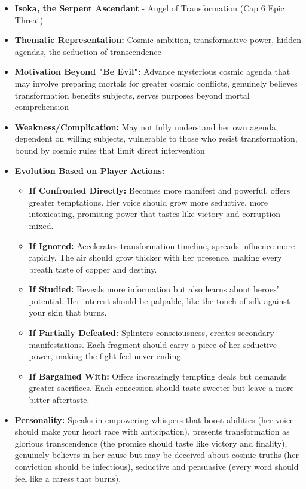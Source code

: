 \documentclass[11pt]{article}
\begin{document}
\begin{itemize}
\item \textbf{Isoka, the Serpent Ascendant} - Angel of Transformation (Cap 6 Epic Threat)
  \item \textbf{Thematic Representation:} Cosmic ambition, transformative power, hidden agendas, the seduction of transcendence
  \item \textbf{Motivation Beyond "Be Evil":} Advance mysterious cosmic agenda that may involve preparing mortals for greater cosmic conflicts, genuinely believes transformation benefits subjects, serves purposes beyond mortal comprehension
  \item \textbf{Weakness/Complication:} May not fully understand her own agenda, dependent on willing subjects, vulnerable to those who resist transformation, bound by cosmic rules that limit direct intervention
  \item \textbf{Evolution Based on Player Actions:}
    \begin{itemize}
    \item \textbf{If Confronted Directly:} Becomes more manifest and powerful, offers greater temptations. Her voice should grow more seductive, more intoxicating, promising power that tastes like victory and corruption mixed.
    \item \textbf{If Ignored:} Accelerates transformation timeline, spreads influence more rapidly. The air should grow thicker with her presence, making every breath taste of copper and destiny.
    \item \textbf{If Studied:} Reveals more information but also learns about heroes' potential. Her interest should be palpable, like the touch of silk against your skin that burns.
    \item \textbf{If Partially Defeated:} Splinters consciousness, creates secondary manifestations. Each fragment should carry a piece of her seductive power, making the fight feel never-ending.
    \item \textbf{If Bargained With:} Offers increasingly tempting deals but demands greater sacrifices. Each concession should taste sweeter but leave a more bitter aftertaste.
    \end{itemize}
  \item \textbf{Personality:} Speaks in empowering whispers that boost abilities (her voice should make your heart race with anticipation), presents transformation as glorious transcendence (the promise should taste like victory and finality), genuinely believes in her cause but may be deceived about cosmic truths (her conviction should be infectious), seductive and persuasive (every word should feel like a caress that burns).

\end{itemize}
\end{document}
